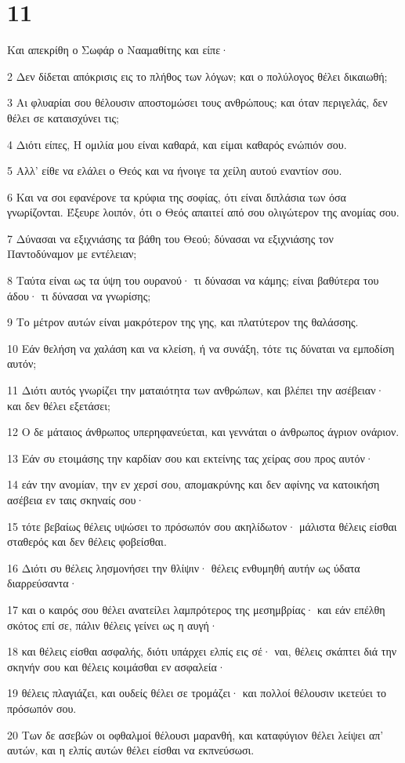 \chapter{11}

\par Και απεκρίθη ο Σωφάρ ο Νααμαθίτης και είπε·
\par 2 Δεν δίδεται απόκρισις εις το πλήθος των λόγων; και ο πολύλογος θέλει δικαιωθή;
\par 3 Αι φλυαρίαι σου θέλουσιν αποστομώσει τους ανθρώπους; και όταν περιγελάς, δεν θέλει σε καταισχύνει τις;
\par 4 Διότι είπες, Η ομιλία μου είναι καθαρά, και είμαι καθαρός ενώπιόν σου.
\par 5 Αλλ' είθε να ελάλει ο Θεός και να ήνοιγε τα χείλη αυτού εναντίον σου.
\par 6 Και να σοι εφανέρονε τα κρύφια της σοφίας, ότι είναι διπλάσια των όσα γνωρίζονται. Έξευρε λοιπόν, ότι ο Θεός απαιτεί από σου ολιγώτερον της ανομίας σου.
\par 7 Δύνασαι να εξιχνιάσης τα βάθη του Θεού; δύνασαι να εξιχνιάσης τον Παντοδύναμον με εντέλειαν;
\par 8 Ταύτα είναι ως τα ύψη του ουρανού· τι δύνασαι να κάμης; είναι βαθύτερα του άδου· τι δύνασαι να γνωρίσης;
\par 9 Το μέτρον αυτών είναι μακρότερον της γης, και πλατύτερον της θαλάσσης.
\par 10 Εάν θελήση να χαλάση και να κλείση, ή να συνάξη, τότε τις δύναται να εμποδίση αυτόν;
\par 11 Διότι αυτός γνωρίζει την ματαιότητα των ανθρώπων, και βλέπει την ασέβειαν· και δεν θέλει εξετάσει;
\par 12 Ο δε μάταιος άνθρωπος υπερηφανεύεται, και γεννάται ο άνθρωπος άγριον ονάριον.
\par 13 Εάν συ ετοιμάσης την καρδίαν σου και εκτείνης τας χείρας σου προς αυτόν·
\par 14 εάν την ανομίαν, την εν χερσί σου, απομακρύνης και δεν αφίνης να κατοικήση ασέβεια εν ταις σκηναίς σου·
\par 15 τότε βεβαίως θέλεις υψώσει το πρόσωπόν σου ακηλίδωτον· μάλιστα θέλεις είσθαι σταθερός και δεν θέλεις φοβείσθαι.
\par 16 Διότι συ θέλεις λησμονήσει την θλίψιν· θέλεις ενθυμηθή αυτήν ως ύδατα διαρρεύσαντα·
\par 17 και ο καιρός σου θέλει ανατείλει λαμπρότερος της μεσημβρίας· και εάν επέλθη σκότος επί σε, πάλιν θέλεις γείνει ως η αυγή·
\par 18 και θέλεις είσθαι ασφαλής, διότι υπάρχει ελπίς εις σέ· ναι, θέλεις σκάπτει διά την σκηνήν σου και θέλεις κοιμάσθαι εν ασφαλεία·
\par 19 θέλεις πλαγιάζει, και ουδείς θέλει σε τρομάζει· και πολλοί θέλουσιν ικετεύει το πρόσωπόν σου.
\par 20 Των δε ασεβών οι οφθαλμοί θέλουσι μαρανθή, και καταφύγιον θέλει λείψει απ' αυτών, και η ελπίς αυτών θέλει είσθαι να εκπνεύσωσι.

